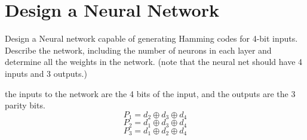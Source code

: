 \section{Design a Neural Network}
Design a Neural network capable of generating Hamming codes for 4-bit inputs. Describe the network, including the number of neurons in each layer and determine all the weights in the network. (note that the neural net should have 4 inputs and 3 outputs.)
\begin{qsolve}
    \begin{qsolve}[]
        the inputs to the network are the 4 bits of the input, and the outputs are the 3 parity bits.
        $$P_1 = d_2 \oplus d_3 \oplus d_4$$
        $$P_2 = d_1 \oplus d_3 \oplus d_4$$
        $$P_3 = d_1 \oplus d_2 \oplus d_4$$
        \begin{center}
\end{center}
\end{qsolve}
\end{qsolve}
